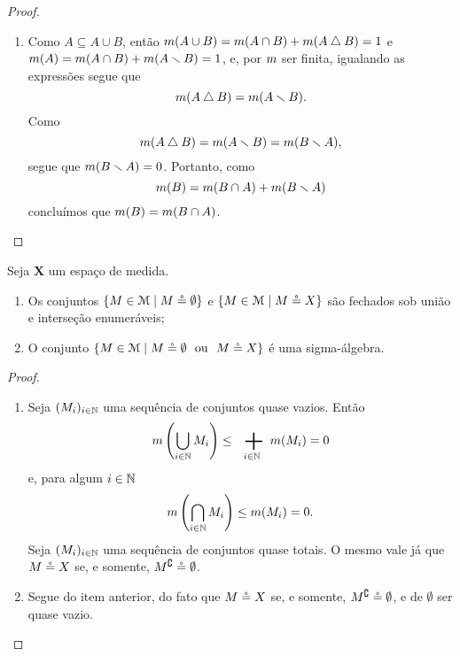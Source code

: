 \begin{proof}
\begin{enumerate}
\item Como $A \subseteq A \cup B$, então $m(A \cup B) = m(A \cap B) + m(A \mathbin{\triangle} B) = 1$ e $m(A) = m(A \cap B) + m(A \smallsetminus B) = 1$, e, por $m$ ser finita, igualando as expressões segue que
	\begin{equation*}
	m(A \mathbin{\triangle} B) = m(A \smallsetminus B).
	\end{equation*}
Como 
	\begin{equation*}
	m(A \mathbin{\triangle} B) = m(A \smallsetminus B) = m(B \smallsetminus A),
	\end{equation*}
segue que $m(B \smallsetminus A)=0$. Portanto, como
	\begin{equation*}
	m(B) = m(B \cap A) + m(B \smallsetminus A)
	\end{equation*}
concluímos que $m(B) = m(B \cap A)$.
	\end{enumerate}
\end{proof}

\begin{proposition}
Seja $\bm X$ um espaço de medida.
	\begin{enumerate}
	\item Os conjuntos $\left\{{M \in \mathcal{M}}\;\middle\vert\;{M \circeq \emptyset}\right\}$ e $\left\{{M \in \mathcal{M}}\;\middle\vert\;{M \circeq X}\right\}$ são fechados sob união e interseção enumeráveis;
	\item O conjunto $\left\{{M \in \mathcal{M}}\;\middle\vert\;{M \circeq \emptyset \text{\ \ ou\ \ } M \circeq X}\right\}$ é uma sigma-álgebra.
	\end{enumerate}
\end{proposition}
\begin{proof}
	\begin{enumerate}
	\item Seja $(M_i)_{i \in \mathbb{N}}$ uma sequência de conjuntos quase vazios. Então
		\begin{equation*}
		\med\left( \bigcup_{i \in \N} M_i \right) \leq \sum_{i \in \N} \med(M_i) = 0
		\end{equation*}
e, para algum $i \in \mathbb{N}$
		\begin{equation*}
		m\left( \bigcap_{i \in \mathbb{N}} M_i \right) \leq m(M_i) = 0.
		\end{equation*}
Seja $(M_i)_{i \in \mathbb{N}}$ uma sequência de conjuntos quase totais. O mesmo vale já que $M \circeq X$ se, e somente, $M^\complement \circeq \emptyset$.
	\item Segue do item anterior, do fato que $M \circeq X$ se, e somente, $M^\complement \circeq \emptyset$, e de $\emptyset$ ser quase vazio.
	\end{enumerate}
\end{proof}

